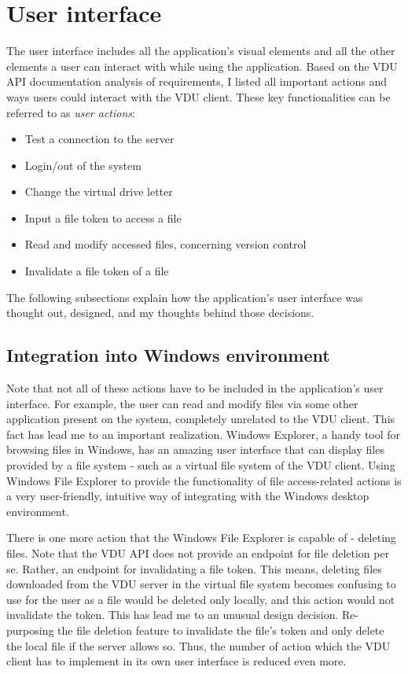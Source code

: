 \section{User interface}
The user interface includes all the application's visual elements and all the other elements a user can interact with while using the application. Based on the VDU API documentation analysis of requirements, I listed all important actions and ways users could interact with the VDU client. These key functionalities can be referred to as \textit{user actions}: 

\begin{itemize}
    \item Test a connection to the server
    \item Login/out of the system
    \item Change the virtual drive letter
    \item Input a file token to access a file
    \item Read and modify accessed files, concerning version control
    \item Invalidate a file token of a file
\end{itemize}

The following subsections explain how the application's user interface was thought out, designed, and my thoughts behind those decisions.

\subsection{Integration into Windows environment}

Note that not all of these actions have to be included in the application's user interface. For example, the user can read and modify files via some other application present on the system, completely unrelated to the VDU client. This fact has lead me to an important realization. Windows Explorer, a handy tool for browsing files in Windows, has an amazing user interface that can display files provided by a file system - such as a virtual file system of the VDU client. 
Using Windows File Explorer to provide the functionality of file access-related actions is a very user-friendly, intuitive way of integrating with the Windows desktop environment.


There is one more action that the Windows File Explorer is capable of - deleting files. Note that the VDU API does not provide an endpoint for file deletion per se. Rather, an endpoint for invalidating a file token. This means, deleting files downloaded from the VDU server in the virtual file system becomes confusing to use for the user as a file would be deleted only locally, and this action would not invalidate the token. This has lead me to an unusual design decision. Re-purposing the file deletion feature to invalidate the file's token and only delete the local file if the server allows so. Thus, the number of action which the VDU client has to implement in its own user interface is reduced even more. 

